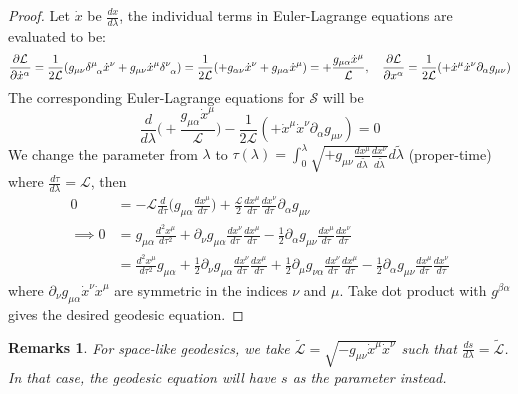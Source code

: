 \documentclass[a4paper]{article}
\newtheorem{remarks}{Remarks}[section]
\theoremstyle{new}
\begin{document}
\begin{proof}
Let $\dot{x}$ be $\frac{dx}{d\lambda}$, the individual terms in Euler-Lagrange equations are evaluated to be:
$$\frac{\partial\mathcal{L}}{\partial\dot{x}^\alpha}=\frac{1}{2\mathcal{L}}(g_{\mu\nu}\tensor*{\delta}{*_{}^{\mu}_{\alpha}}\dot{x}^\nu+g_{\mu\nu}\dot{x}^\mu\tensor*{\delta}{*_{}^{\nu}_{\alpha}})=\frac{1}{2\mathcal{L}}(+g_{\alpha\nu}\dot{x}^\nu+g_{\mu\alpha}\dot{x}^\mu)=+\frac{g_{\mu\alpha}\dot{x}^\mu}{\mathcal{L}},\quad\frac{\partial\mathcal{L}}{\partial x^\alpha}=\frac{1}{2\mathcal{L}}(+\dot{x}^\mu\dot{x}^\nu\partial_\alpha g_{\mu\nu})$$
The corresponding Euler-Lagrange equations for $\mathcal{S}$ will be 
$$\frac{d}{d\lambda}\bigg(+\frac{g_{\mu\alpha}\dot{x}^\mu}{\mathcal{L}}\bigg)-\frac{1}{2\mathcal{L}}(+\dot{x}^\mu\dot{x}^\nu\partial_\alpha g_{\mu\nu})=0$$
We change the parameter from $\lambda$ to $\tau(\lambda)=\int_0^\lambda\sqrt{+g_{\mu\nu}\frac{dx^\mu}{d\tilde{\lambda}}\frac{dx^\nu}{d\tilde{\lambda}}}d\tilde{\lambda}$ (proper-time) where $\frac{d\tau}{d\lambda}=\mathcal{L}$, then
\begin{align}
0&=-\mathcal{L}\frac{d}{d\tau}\bigg(g_{\mu\alpha}\frac{dx^\mu}{d\tau}\bigg)+\frac{\mathcal{L}}{2}\frac{dx^\mu}{d\tau}\frac{dx^\nu}{d\tau}\partial_\alpha g_{\mu\nu}\nonumber\\
\implies 0&=g_{\mu\alpha}\frac{d^2x^\mu}{d\tau^2}+\partial_\nu g_{\mu\alpha}\frac{dx^\nu}{d\tau}\frac{dx^\mu}{d\tau}-\frac{1}{2}\partial_\alpha g_{\mu\nu}\frac{dx^\mu}{d\tau}\frac{dx^\nu}{d\tau}\nonumber\\&=\frac{d^2x^\mu}{d\tau^2}g_{\mu\alpha}+\frac{1}{2}\partial_\nu g_{\mu\alpha}\frac{dx^\nu}{d\tau}\frac{dx^\mu}{d\tau}+\frac{1}{2}\partial_\mu g_{\nu\alpha}\frac{dx^\nu}{d\tau}\frac{dx^\mu}{d\tau}-\frac{1}{2}\partial_\alpha g_{\mu\nu}\frac{dx^\mu}{d\tau}\frac{dx^\nu}{d\tau}\nonumber
\end{align}
where $\partial_\nu g_{\mu\alpha}\dot{x}^\nu\dot{x}^\mu$ are symmetric in the indices $\nu$ and $\mu$. Take dot product with $g^{\beta\alpha}$ gives the desired geodesic equation.
\end{proof}
\begin{remarks}
For space-like geodesics, we take $\tilde{\mathcal{L}}=\sqrt{-g_{\mu\nu}\dot{x}^\mu\dot{x}^\nu}$ such that $\frac{ds}{d\lambda}=\tilde{\mathcal{L}}$. In that case, the geodesic equation will have $s$ as the parameter instead.
\end{remarks}
\end{document}
